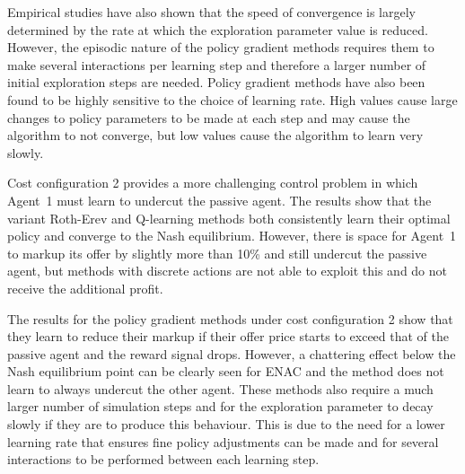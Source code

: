 Empirical studies have also shown that the speed of convergence is largely
determined by the rate at which the exploration parameter value is reduced.
However, the episodic nature of the policy gradient methods requires them to
make several interactions per learning step and therefore a larger number of
initial exploration steps are needed.  Policy gradient methods have also been
found to be highly sensitive to the choice of learning rate.  High
values cause large changes to policy parameters to be made at each step and
may cause the algorithm to not converge, but low values cause the
algorithm to learn very slowly.

Cost configuration 2 provides a more challenging control problem in which
Agent~1 must learn to undercut the passive agent.  The results show that the
variant Roth-Erev and Q-learning methods both consistently learn their optimal
policy and converge to the Nash equilibrium.  However, there is space for
Agent~1 to markup its offer by slightly more than 10\% and still undercut the
passive agent, but methods with discrete actions are not able to exploit this
and do not receive the additional profit.

The results for the policy gradient methods under cost configuration 2 show that
they learn to reduce their markup if their offer price starts to exceed
that of the passive agent and the reward signal drops.  However, a chattering
effect below the Nash equilibrium point can be clearly seen for ENAC and the
method does not learn to always undercut the other agent.  These methods also
require a much larger number of simulation steps and for the exploration
parameter to decay slowly if they are to produce this behaviour.  This
is due to the need for a lower learning rate that ensures fine policy
adjustments can be made and for several interactions to be performed between
each learning step.

